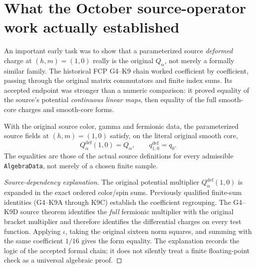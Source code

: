 \section{What the October source-operator work actually established}
An important early task was to show that a parameterized source
\emph{deformed} charge at $(h,m)=(1,0)$ really is the original $Q_\alpha$,
not merely a formally similar family. The historical FCP G4--K9 chain
worked coefficient by coefficient, passing through the original matrix
commutators and finite index sums. Its accepted endpoint was stronger
than a numeric comparison: it proved equality of the source's
potential \emph{continuous linear maps}, then equality of the full
smooth-core charges and smooth-core forms.

\begin{theorem}\label{thm:massless-identity}
With the original source color, gamma and fermionic data, the parameterized
source fields at $(h,m)=(1,0)$ satisfy, on the literal original smooth
core,
\begin{equation}\label{eq:massless-identification}
 Q^{\mathrm{def}}_\alpha(1,0)=Q_\alpha,
 \qquad q^{\mathrm{def}}_{1,0}=q_0.
\end{equation}
The equalities are those of the actual source definitions for every
admissible \texttt{AlgebraData}, not merely of a chosen finite sample.
\end{theorem}
\begin{proof}[Source-dependency explanation]
The original potential multiplier $Q^{\mathrm{def}}_\alpha(1,0)$ is
expanded in the exact ordered color/spin sums. Previously qualified
finite-sum identities (G4--K9A through K9C) establish the coefficient
regrouping. The G4--K9D source theorem identifies the \emph{full}
fermionic multiplier with the original bracket multiplier and therefore
identifies the differential charges on every test function. Applying
$\iota$, taking the original sixteen norm squares, and summing with the
same coefficient $1/16$ gives the form equality. The explanation records
the logic of the accepted formal chain; it does not silently treat a
finite floating-point check as a universal algebraic proof.
\end{proof}

